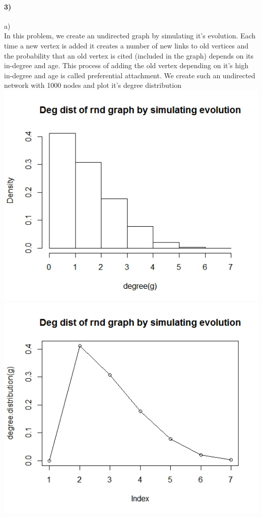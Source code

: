 \documentclass{article}
\begin{document}
\paragraph{3)}
a)\\
In this problem, we create an undirected graph by simulating it's evolution.
Each time a new vertex is added it creates a number of new links
to old vertices and the probability that an old vertex is cited (included in the graph)
depends on its in-degree and age. This process of adding the old vertex depending on it's 
high in-degree and age is called preferential attachment. We create such an undirected network with 1000 nodes
and plot it's degree distribution \\
\includegraphics[scale=0.4]{pc1} \\
\includegraphics[scale=0.4]{pc2} \\
\end{document}
